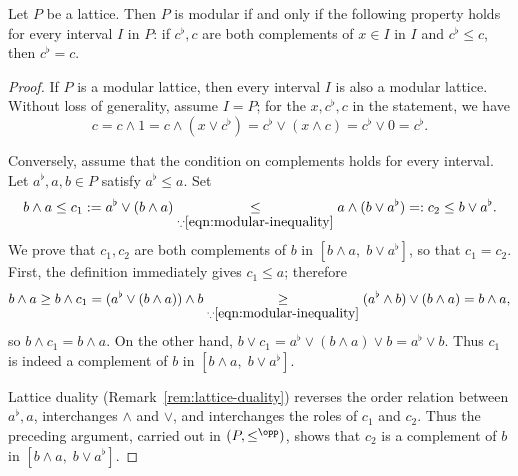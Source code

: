 \begin{lemma}\label{prop:modularity-criterion}
	Let $P$ be a lattice. Then $P$ is modular if and only if the following
	property holds for every interval $I$ in $P$: if $c^\flat,c$ are both
	complements of $x\in I$ in $I$ and $c^\flat\leq c$, then $c^\flat=c$.
\end{lemma}
\begin{proof}
	If $P$ is a modular lattice, then every interval $I$ is also a modular
	lattice. Without loss of generality, assume $I=P$; for the $x,c^\flat,c$ in
	the statement, we have
	\[ c = c \wedge 1 = c \wedge (x \vee c^\flat) = c^\flat \vee (x \wedge c) = c^\flat \vee 0 = c^\flat . \]

	Conversely, assume that the condition on complements holds for every
	interval. Let $a^\flat,a,b\in P$ satisfy $a^\flat\leq a$. Set
	\[ b \wedge a \leq c_1 := a^\flat \vee (b \wedge a) \underset{\because \eqref{eqn:modular-inequality}}{\leq} a \wedge (b \vee a^\flat) =: c_2 \leq b \vee a^\flat. \]
	We prove that $c_1,c_2$ are both complements of $b$ in
	$\left[b\wedge a,\;b\vee a^\flat\right]$, so that $c_1=c_2$. First, the
	definition immediately gives $c_1\leq a$; therefore
	\[ b \wedge a \geq b \wedge c_1 = (a^\flat \vee (b \wedge a)) \wedge b \underset{\because \eqref{eqn:modular-inequality}}{\geq} (a^\flat \wedge b) \vee (b \wedge a) = b \wedge a , \]
	so $b\wedge c_1=b\wedge a$. On the other hand,
	$b\vee c_1=a^\flat\vee(b\wedge a)\vee b=a^\flat\vee b$. Thus $c_1$ is
	indeed a complement of $b$ in
	$\left[b\wedge a,\;b\vee a^\flat\right]$.

	Lattice duality (Remark~\ref{rem:lattice-duality}) reverses the order
	relation between $a^\flat,a$, interchanges $\wedge$ and $\vee$, and
	interchanges the roles of $c_1$ and $c_2$. Thus the preceding argument,
	carried out in $(P,\leq^{\opp})$, shows that $c_2$ is a complement of $b$
	in $\left[b\wedge a,\;b\vee a^\flat\right]$.
\end{proof}

